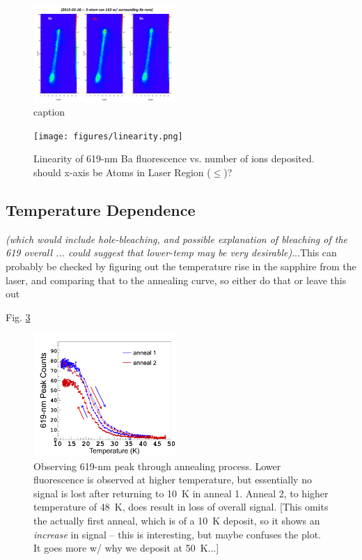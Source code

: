 \documentclass[aps,pra,reprint,superscriptaddress]{revtex4-1}
\begin{document}
\begin{figure}
\includegraphics[width=0.48\textwidth]{figures/image_raw_3-atom_with_pre-post-.png}
\caption{caption}
\label{fig:raw}
\end{figure}

\begin{figure}
\texttt{[image: figures/linearity.png]}
\caption{Linearity of 619-nm Ba fluorescence vs. number of ions deposited.  {\color{red}should x-axis be Atoms in Laser Region ($\leq$)?}}
\label{fig:linearity}
\end{figure}

\subsection{Temperature Dependence}

{\color{gray}\emph{(which would include hole-bleaching, and possible explanation of bleaching of the 619 overall ... could suggest that lower-temp may be very desirable)}}{\color{red}...This can probably be checked by figuring out the temperature rise in the sapphire from the laser, and comparing that to the annealing curve, so either do that or leave this out}

Fig. \ref{fig:anneal}

\begin{figure}
\includegraphics[width=0.48\textwidth]{figures/paper_single-atom_619-anneal_20150916_runs36and37_omitRun34_arrows.png}
\caption{Observing 619-nm peak through annealing process.  Lower fluorescence is observed at higher temperature, but essentially no signal is lost after returning to 10~K in anneal 1.  Anneal 2, to higher temperature of 48~K, does result in loss of overall signal.  {\color{red}[This omits the actually first anneal, which is of a 10~K deposit, so it shows an \emph{increase} in signal -- this is interesting, but maybe confuses the plot.  It goes more w/ why we deposit at 50~K...]}}
\label{fig:anneal}
\end{figure}
\end{document}

